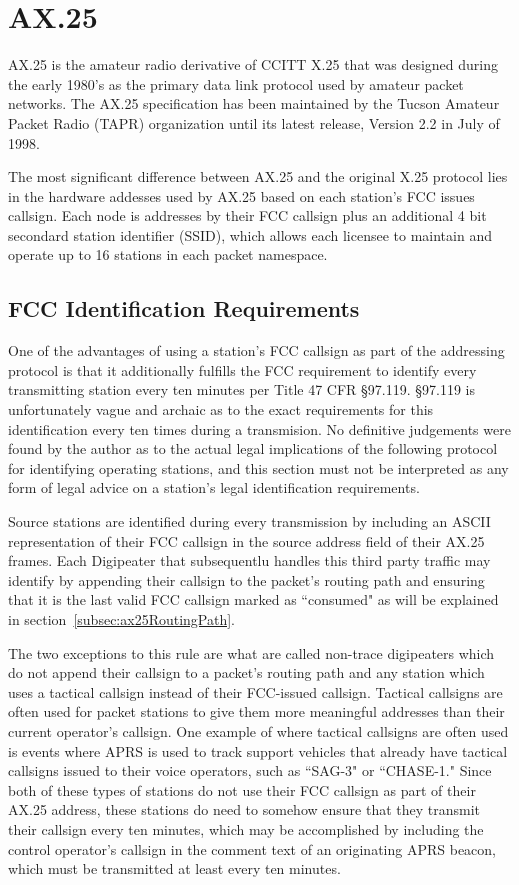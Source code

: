\chapter{AX.25}

AX.25 is the amateur radio derivative of CCITT X.25 that was designed during the early 1980's 
as the primary data link protocol used by amateur packet networks.
The AX.25 specification has been maintained by the Tucson Amateur Packet Radio (TAPR) 
organization until its latest release, Version 2.2 in July of 1998. 

The most significant difference between AX.25 and the original X.25 protocol lies
in the hardware addesses used by AX.25 based on each station's FCC issues callsign. 
Each node is addresses by their FCC callsign plus an additional 4 bit 
secondard station identifier (SSID), which allows each licensee to maintain and operate 
up to 16 stations in each packet namespace.

\section{FCC Identification Requirements}

One of the advantages of using a station's FCC callsign as part of the addressing protocol
is that it additionally fulfills the FCC requirement to identify every transmitting station
every ten minutes per Title 47 CFR \S97.119. \S97.119 is unfortunately vague and archaic as
to the exact requirements for this identification every ten times during a transmision. No
definitive judgements were found by the author as to 
the actual legal implications of the following protocol
for identifying operating stations, and this section must not be interpreted as any form of
legal advice on a station's legal identification requirements.

Source stations are identified during every transmission by including an ASCII representation
of their FCC callsign in the source address field of their AX.25 frames. 
Each Digipeater that subsequentlu handles this third party traffic may identify by appending 
their callsign to the packet's routing path and ensuring that it is the last valid FCC callsign
marked as ``consumed" as will be explained in section~\ref{subsec:ax25RoutingPath}.

The two exceptions to this rule are what are called non-trace digipeaters which do not
append their callsign to a packet's routing path and any station which uses a tactical callsign
instead of their FCC-issued callsign. Tactical callsigns are often used for packet stations to
give them more meaningful addresses than their current operator's callsign. One example of where
tactical callsigns are often used is events where APRS is used to track support vehicles that 
already have tactical callsigns issued to their voice operators, such as ``SAG-3" or ``CHASE-1."
Since both of these types of stations do not use their FCC callsign as part of their AX.25 address,
these stations do need to somehow ensure that they transmit their callsign every ten minutes, which
may be accomplished by including the control operator's callsign in the comment text of an 
originating APRS beacon, which must be transmitted at least every ten minutes.

